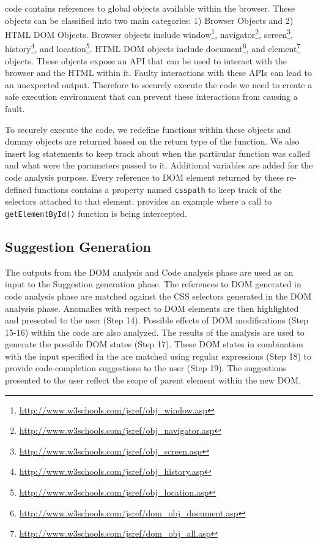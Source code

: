 		
			\javascript code contains references to global objects available within the browser. These objects can be classified into two main categories: 1) Browser Objects and 2) HTML DOM Objects. Browser objects include window\footnote{\url{http://www.w3schools.com/jsref/obj_window.asp}}, navigator\footnote{\url{http://www.w3schools.com/jsref/obj_navigator.asp}}, screen\footnote{\url{http://www.w3schools.com/jsref/obj_screen.asp}}, history\footnote{\url{http://www.w3schools.com/jsref/obj_history.asp}},  and location\footnote{\url{http://www.w3schools.com/jsref/obj_location.asp}}. HTML DOM objects include document\footnote{\url{http://www.w3schools.com/jsref/dom_obj_document.asp}}, and element\footnote{\url{http://www.w3schools.com/jsref/dom_obj_all.asp}} objects. These objects expose an API that can be used to interact with the browser and the HTML within it. Faulty interactions with these APIs can lead to an unexpected output. Therefore to securely execute the code we need to create a safe execution environment that can prevent these interactions from causing a fault.
			
			To securely execute the \javascript code, we redefine functions within these objects and dummy objects are returned based on the return type of the function. We also insert log statements to keep track about when the particular function was called and what were the parameters passed to it. Additional variables are added for the code analysis purpose. Every reference to DOM element returned by these re-defined functions contains a property named \texttt{csspath} to keep track of the \css selectors attached to that element.  provides an example where a call to \texttt{getElementById()} function is being intercepted.

	
	\subsection{Suggestion Generation}
	\label{Sec:Suggestions}
		
		The outputs from the DOM analysis and Code analysis phase are used as an input to the Suggestion generation phase. The references to DOM generated in code analysis phase are matched against the CSS selectors generated in the DOM analysis phase. Anomalies with respect to DOM elements are then highlighted and presented to the user (Step 14). Possible effects of DOM modifications (Step 15-16) within the \javascript code are also analyzed. The results of the analysis are used to generate the possible DOM states (Step 17). These DOM states in combination with the input specified in the  are matched using regular expressions (Step 18) to provide code-completion suggestions to the user (Step 19). The suggestions presented to the user reflect the scope of parent element within the new DOM.
		
